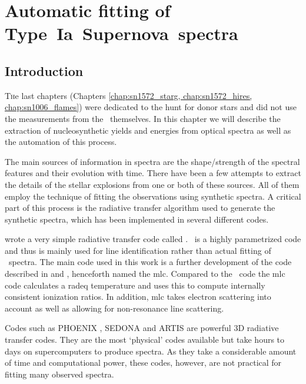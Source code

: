 \chapter{Automatic fitting of Type~Ia~Supernova~spectra}
\label{chap:dalek}
\section{Introduction}
\label{sec:dalek_intro}

\lettrine{T}he last chapters (Chapters \ref{chap:sn1572_starg, chap:sn1572_hires, chap:sn1006_flames}) were dedicated to the hunt for donor stars and did not use the measurements from the \sneia\ themselves. In this chapter we will describe the extraction of nucleosynthetic yields and energies from optical spectra as well as the automation of this process.

The main sources of information in spectra are the shape/strength of the spectral features and their evolution with time. There have been a few attempts to extract the details of the stellar explosions from one or both of these sources. All of them employ the technique of fitting the observations using synthetic spectra. A critical part of this process is the radiative transfer algorithm used to generate the synthetic spectra, which has been implemented in several different codes.


\cite{2000PhDT.........6F} wrote a very simple radiative transfer code called \synow. \synow\ is a highly parametrized code and thus is mainly used for line identification rather than actual fitting of \snia\ spectra. 
The main code used in this work is a further development of the code described in \citet{1993A&A...279..447M}  and \citet{2000A&A...363..705M}, henceforth named the \gls{mlc}. Compared to the \synow\ code the \gls{mlc} code calculates a \gls{radeq} temperature and uses this to compute internally consistent ionization ratios. In addition, \gls{mlc} takes electron scattering into account as well as allowing for non-resonance line scattering. 

Codes such as PHOENIX \cite{1999JCoAM.109...41H}, SEDONA \cite{2006ApJ...651..366K} and ARTIS \cite{2009MNRAS.398.1809K} are powerful 3D radiative transfer codes. They are the most `physical' codes available but take hours to days on supercomputers to produce spectra. As they take a considerable amount of time and computational power, these codes, however, are not practical for fitting many observed spectra.

